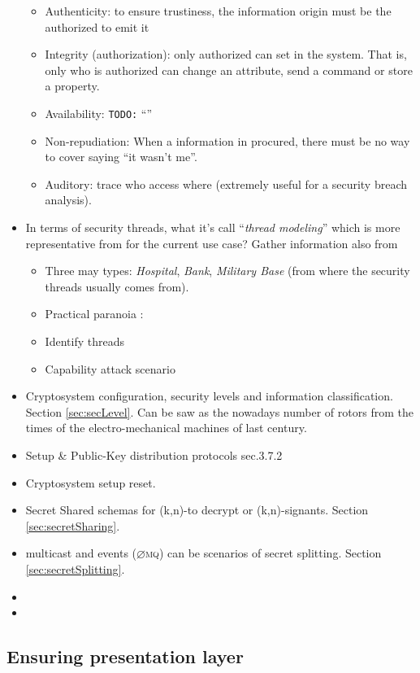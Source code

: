 \documentclass[10pt,a4paper,twoside]{llncs}
\newcommand{\todo}[1]{\texttt{\color{red}TODO:} ``\emph{#1}''}
\newcommand{\zmq}{\textsc{$\varnothing$mq}}
\begin{document}
\begin{itemize}
\begin{itemize}
        \item Authenticity: to ensure trustiness, the information origin must be the authorized to emit it
        \item Integrity (authorization): only authorized can set in the system. That is, only who is authorized can change an attribute, send a command or store a property.
        \item Availability: \todo{}
        \item Non-repudiation: When a information in procured, there must be no way to cover saying ``it wasn't me''.
        \item Auditory: trace who access where (extremely useful for a security breach analysis).
    \end{itemize}
    \item In terms of security threads, what it's call ``\emph{thread modeling}'' which is more representative from \cite{SecEngRossAnderson} for the current use case? Gather information also from \cite{cryptoEngineering}
    \begin{itemize}
        \item Three may types: \emph{Hospital}, \emph{Bank}, \emph{Military Base} (from where the security threads usually comes from).
        \item Practical paranoia \cite{PractCryptoSchneier}:
        \item Identify threads
        \item Capability attack scenario
    \end{itemize}
    \item Cryptosystem configuration, security levels and information classification. Section \ref{sec:secLevel}. Can be saw as the nowadays number of rotors from the times of the electro-mechanical machines of last century.
    \item Setup \& Public-Key distribution protocols \cite{SecEngRossAnderson} sec.3.7.2
    \item Cryptosystem setup reset.
    \item Secret Shared schemas for (k,n)-to decrypt or (k,n)-signants. Section \ref{sec:secretSharing}.
    \item multicast and events (\zmq) can be scenarios of secret splitting. Section \ref{sec:secretSplitting}.
    \item 
    \item 
\end{itemize}

%
\subsection{Ensuring presentation layer \label{sec:presentationLayer}}
\end{document}
